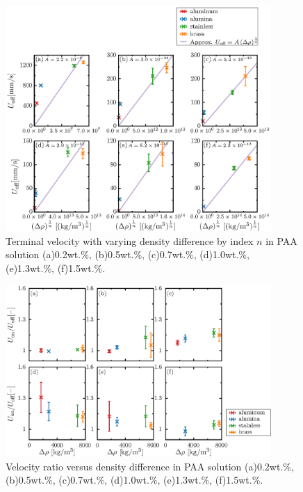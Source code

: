 \begin{figure}[ht]
    \centering
    \includegraphics[width=0.9\textwidth]{./5-Results/rhoUT_index_n.eps}
    \caption{Terminal velocity with varying density difference by index $n$ in PAA solution (a)0.2wt.\%, (b)0.5wt.\%, (c)0.7wt.\%, (d)1.0wt.\%, (e)1.3wt.\%, (f)1.5wt.\%.}
    \label{fig:rhoUT_n}
\end{figure}

\begin{figure}[ht]
    \centering
    \includegraphics[width=0.9\textwidth]{./5-Results/rhoUdiff.eps}
    \caption{Velocity ratio versus density difference in PAA solution (a)0.2wt.\%, (b)0.5wt.\%, (c)0.7wt.\%, (d)1.0wt.\%, (e)1.3wt.\%, (f)1.5wt.\%.}
    \label{fig:rhoUdiff}
\end{figure}

